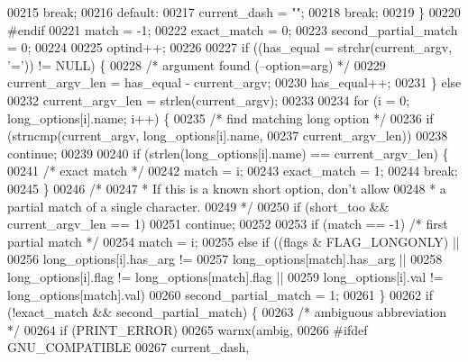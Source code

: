 \begin{DoxyCode}
{{{{{{{{{{{00215             \textcolor{keywordflow}{break};
00216         \textcolor{keywordflow}{default}:
00217             current\_dash = \textcolor{stringliteral}{""};
00218             \textcolor{keywordflow}{break};
00219     \}
00220 \textcolor{preprocessor}{#endif}
00221     match = -1;
00222     exact\_match = 0;
00223     second\_partial\_match = 0;
00224 
00225     optind++;
00226 
00227     \textcolor{keywordflow}{if} ((has\_equal = strchr(current\_argv, \textcolor{charliteral}{'='})) != NULL) \{
00228         \textcolor{comment}{/* argument found (--option=arg) */}
00229         current\_argv\_len = has\_equal - current\_argv;
00230         has\_equal++;
00231     \} \textcolor{keywordflow}{else}
00232         current\_argv\_len = strlen(current\_argv);
00233 
00234     \textcolor{keywordflow}{for} (i = 0; long\_options[i].name; i++) \{
00235         \textcolor{comment}{/* find matching long option */}
00236         \textcolor{keywordflow}{if} (strncmp(current\_argv, long\_options[i].name,
00237             current\_argv\_len))
00238             \textcolor{keywordflow}{continue};
00239 
00240         \textcolor{keywordflow}{if} (strlen(long\_options[i].name) == current\_argv\_len) \{
00241             \textcolor{comment}{/* exact match */}
00242             match = i;
00243             exact\_match = 1;
00244             \textcolor{keywordflow}{break};
00245         \}
00246         \textcolor{comment}{/*}
00247 \textcolor{comment}{         * If this is a known short option, don't allow}
00248 \textcolor{comment}{         * a partial match of a single character.}
00249 \textcolor{comment}{         */}
00250         \textcolor{keywordflow}{if} (short\_too && current\_argv\_len == 1)
00251             \textcolor{keywordflow}{continue};
00252 
00253         \textcolor{keywordflow}{if} (match == -1)        \textcolor{comment}{/* first partial match */}
00254             match = i;
00255         \textcolor{keywordflow}{else} \textcolor{keywordflow}{if} ((flags & FLAG\_LONGONLY) ||
00256              long\_options[i].has\_arg !=
00257                  long\_options[match].has\_arg ||
00258              long\_options[i].flag != long\_options[match].flag ||
00259              long\_options[i].val != long\_options[match].val)
00260             second\_partial\_match = 1;
00261     \}
00262     \textcolor{keywordflow}{if} (!exact\_match && second\_partial\_match) \{
00263         \textcolor{comment}{/* ambiguous abbreviation */}
00264         \textcolor{keywordflow}{if} (PRINT\_ERROR)
00265             warnx(ambig,
00266 #ifdef GNU\_COMPATIBLE
00267                  current\_dash,
}}}}}}}}}}}
\end{DoxyCode}
